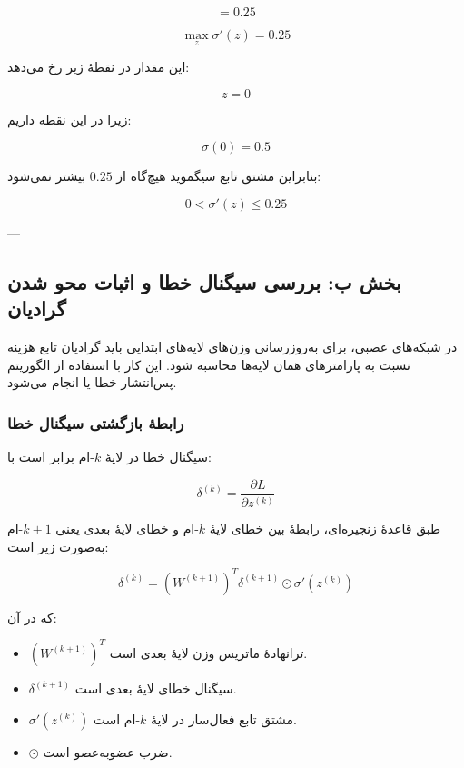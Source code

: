 \documentclass[12pt,a4paper]{article}
\begin{document}
\[
=
0.25
\]

\begin{tcolorbox}[
	colback=softorange,
	colframe=golden,
	title=نتیجهٔ بخش الف,
	coltitle=black
	]
	\[
	\boxed{
		\max_z \sigma'(z)=0.25
	}
	\]
	
	این مقدار در نقطهٔ زیر رخ می‌دهد:
	
	\[
	\boxed{
		z=0
	}
	\]
	
	زیرا در این نقطه داریم:
	
	\[
	\sigma(0)=0.5
	\]
\end{tcolorbox}

بنابراین مشتق تابع سیگموید هیچ‌گاه از \(0.25\) بیشتر نمی‌شود:

\[
\boxed{
	0<\sigma'(z)\leq 0.25
}
\]

---

\subsection{بخش ب: بررسی سیگنال خطا و اثبات محو شدن گرادیان}

در شبکه‌های عصبی، برای به‌روزرسانی وزن‌های لایه‌های ابتدایی باید گرادیان تابع هزینه نسبت به پارامترهای همان لایه‌ها محاسبه شود. این کار با استفاده از الگوریتم پس‌انتشار خطا یا  انجام می‌شود.

\subsubsection{رابطهٔ بازگشتی سیگنال خطا}

سیگنال خطا در لایهٔ \(k\)-ام برابر است با:

\[
\delta^{(k)} = \frac{\partial L}{\partial z^{(k)}}
\]

طبق قاعدهٔ زنجیره‌ای، رابطهٔ بین خطای لایهٔ \(k\)-ام و خطای لایهٔ بعدی یعنی \(k+1\)-ام به‌صورت زیر است:

\[
\delta^{(k)}
=
\left(W^{(k+1)}\right)^T
\delta^{(k+1)}
\odot
\sigma'(z^{(k)})
\]

که در آن:

\begin{itemize}
	\item \(\left(W^{(k+1)}\right)^T\) ترانهادهٔ ماتریس وزن لایهٔ بعدی است.
	\item \(\delta^{(k+1)}\) سیگنال خطای لایهٔ بعدی است.
	\item \(\sigma'(z^{(k)})\) مشتق تابع فعال‌ساز در لایهٔ \(k\)-ام است.
	\item \(\odot\) ضرب عضو‌به‌عضو است.
\end{itemize}
\end{document}
